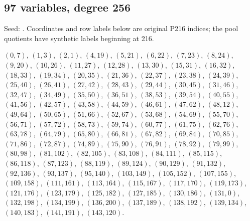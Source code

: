 \subsection*{97 variables, degree 256}
Seed: . Coordinates and row labels below are original P216 indices; the pool quotients have synthetic labels beginning at 216.
{\small\raggedright
$(0,7)$, $(1,3)$, $(2,1)$, $(4,19)$, $(5,21)$, $(6,22)$, $(7,23)$, $(8,24)$, $(9,20)$, $(10,26)$, $(11,27)$, $(12,28)$, $(13,30)$, $(15,31)$, $(16,32)$, $(18,33)$, $(19,34)$, $(20,35)$, $(21,36)$, $(22,37)$, $(23,38)$, $(24,39)$, $(25,40)$, $(26,41)$, $(27,42)$, $(28,43)$, $(29,44)$, $(30,45)$, $(31,46)$, $(32,47)$, $(34,49)$, $(35,50)$, $(36,51)$, $(38,53)$, $(39,54)$, $(40,55)$, $(41,56)$, $(42,57)$, $(43,58)$, $(44,59)$, $(46,61)$, $(47,62)$, $(48,12)$, $(49,64)$, $(50,65)$, $(51,66)$, $(52,67)$, $(53,68)$, $(54,69)$, $(55,70)$, $(56,71)$, $(57,72)$, $(58,73)$, $(59,74)$, $(60,77)$, $(61,75)$, $(62,76)$, $(63,78)$, $(64,79)$, $(65,80)$, $(66,81)$, $(67,82)$, $(69,84)$, $(70,85)$, $(71,86)$, $(72,87)$, $(74,89)$, $(75,90)$, $(76,91)$, $(78,92)$, $(79,99)$, $(80,98)$, $(81,102)$, $(82,105)$, $(83,108)$, $(84,111)$, $(85,115)$, $(86,118)$, $(87,123)$, $(88,119)$, $(89,124)$, $(90,129)$, $(91,132)$, $(92,136)$, $(93,137)$, $(95,140)$, $(103,149)$, $(105,152)$, $(107,155)$, $(109,158)$, $(111,161)$, $(113,164)$, $(115,167)$, $(117,170)$, $(119,173)$, $(121,176)$, $(123,179)$, $(125,182)$, $(127,185)$, $(130,186)$, $(131,0)$, $(132,198)$, $(134,199)$, $(136,200)$, $(137,189)$, $(138,192)$, $(139,134)$, $(140,183)$, $(141,191)$, $(143,120)$.\par}

